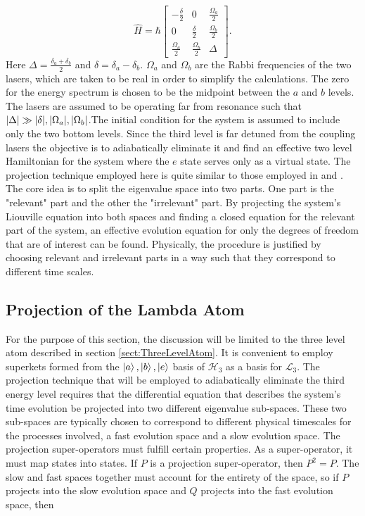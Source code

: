 \documentclass[12pt]{article}
\begin{document}
\begin{equation}\label{eq:Lambda_Hamiltonian}
    \widehat{H}=\hbar\left[\begin{array}{ccc}
-\frac{\delta}{2} & 0 & \frac{\Omega_{a}}{2} \\
0 & \frac{\delta}{2} & \frac{\Omega_{b}}{2} \\
\frac{\Omega_{a}}{2} & \frac{\Omega_{b}}{2} & \Delta
\end{array}\right].
\end{equation} Here $\Delta = \frac{\delta_a+\delta_b}{2}$ and $\delta = \delta_a-\delta_b$. $\Omega_a$ and $\Omega_b$ are the Rabbi frequencies of the two lasers, which are taken to be real in order to simplify the calculations. The zero for the energy spectrum is chosen to be the midpoint between the $a$ and $b$ levels. The lasers are assumed to be operating far from resonance such that $\abs{\Delta} \gg \abs{\delta},\abs{\Omega_a}, \abs{\Omega_b}$.The initial condition for the system is assumed to include only the two bottom levels. Since the third level is far detuned from the coupling lasers the objective is to adiabatically eliminate it and find an effective two level Hamiltonian for the system where the $e$ state serves only as a virtual state\cite{Gerry3LA1990}. The projection technique employed here is quite similar to those employed in \cite{NakajimaProyectors1958} and \cite{ZwanzigProyectors1960}. The core idea is to split the eigenvalue space into two parts. One part is the "relevant" part and the other the "irrelevant" part. By projecting the system's Liouville equation into both spaces and finding a closed equation for the relevant part of the system, an effective evolution equation for only the degrees of freedom that are of interest can be found. Physically, the procedure is justified by choosing relevant and irrelevant parts in a way such that they correspond to different time scales.

\subsection{Projection of the Lambda Atom}

For the purpose of this section, the discussion will be limited to the three level atom described in section \ref{sect:ThreeLevelAtom}. It is convenient to employ superkets formed from the $\ket{a},\ket{b},\ket{e}$ basis of $\mathcal{H}_3$ as a basis for $\mathcal{L}_3$.  The projection technique that will be employed to adiabatically eliminate the third energy level requires that the differential equation that describes the system's time evolution be projected into two different eigenvalue sub-spaces. These two sub-spaces are typically chosen to correspond to different physical timescales for the processes involved, a fast evolution space and a slow evolution space. The projection super-operators must fulfill certain properties. As a super-operator, it must map states into states. If $P$ is a projection super-operator, then $P^2 = P$. The slow and fast spaces together must account for the entirety of the space, so if $P$ projects into the slow evolution space and $Q$ projects into the fast evolution space, then
\end{document}
